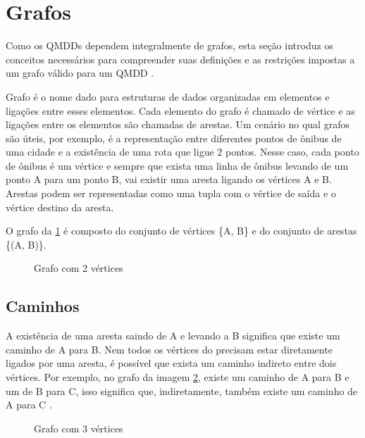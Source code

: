 \section{Grafos}\label{sec:graph}

Como os QMDDs dependem integralmente de grafos, esta seção introduz os conceitos necessários para compreender suas definições e as restrições impostas a um grafo válido para um QMDD \cite{jungnickel}.

Grafo é o nome dado para estruturas de dados organizadas em elementos e ligações entre esses elementos. Cada elemento do grafo é chamado de vértice e as ligações entre os elementos são chamadas de arestas. Um cenário no qual grafos são úteis, por exemplo, é a representação entre diferentes pontos de ônibus de uma cidade e a existência de uma rota que ligue 2 pontos. Nesse caso, cada ponto de ônibus é um vértice e sempre que exista uma linha de ônibus levando de um ponto A para um ponto B, vai existir uma aresta ligando os vértices A e B. Arestas podem ser representadas como uma tupla com o vértice de saída e o vértice destino da aresta.

O grafo da \cref{fig:graph2nodes} é composto do conjunto de vértices \{A, B\} e do conjunto de arestas \{(A, B)\}.

\begin{figure}[ht]
  \centering
  \caption{Grafo com 2 vértices}
  \label{fig:graph2nodes}
\end{figure}


\subsection{Caminhos}
A existência de uma aresta saindo de A e levando a B significa que existe um caminho de A para B. Nem todos os vértices do precisam estar diretamente ligados por uma aresta, é possível que exista um caminho indireto entre dois vértices. Por exemplo, no grafo da imagem \cref{fig:graph3node}, existe um caminho de A para B e um de B para C, isso significa que, indiretamente, também existe um caminho de A para C \cite{jungnickel}.

\begin{figure}[ht]
  \centering
  \caption{Grafo com 3 vértices}
  \label{fig:graph3node}
\end{figure}

